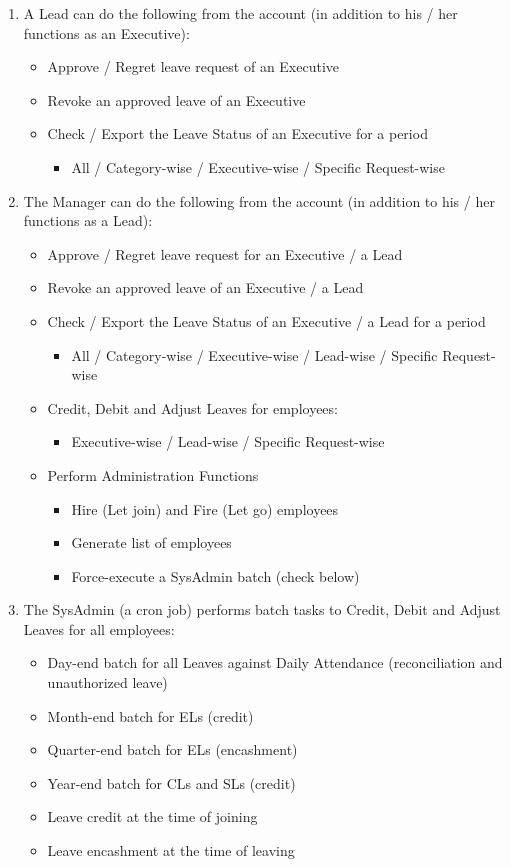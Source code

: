 \documentclass{article}
\begin{document}
\begin{footnotesize}
\begin{enumerate}
\begin{enumerate}
\item A Lead can do the following from the account (in addition to his / her functions as an Executive):
\begin{itemize}
\item Approve / Regret leave request of an Executive
\item Revoke an approved leave of an Executive
\item Check / Export the Leave Status of an Executive for a period
\begin{itemize}
\item All / Category-wise / Executive-wise / Specific Request-wise
\end{itemize}
\end{itemize}

\item The Manager can do the following from the account (in addition to his / her functions as a Lead):
\begin{itemize}
\item Approve / Regret leave request for an Executive / a Lead
\item Revoke an approved leave of an Executive / a Lead
\item Check / Export the Leave Status of an Executive / a Lead  for a period
\begin{itemize}
\item All / Category-wise / Executive-wise / Lead-wise / Specific Request-wise
\end{itemize}
\item Credit, Debit and Adjust Leaves for employees:
\begin{itemize}
\item Executive-wise / Lead-wise / Specific Request-wise
\end{itemize} 
\item Perform Administration Functions
\begin{itemize}
\item Hire (Let join) and Fire (Let go) employees
\item Generate list of employees
\item Force-execute a SysAdmin batch (check below)
\end{itemize}

\end{itemize}
\item The SysAdmin (a cron job) performs batch tasks to Credit, Debit and Adjust Leaves for all employees:
\begin{itemize}
\item Day-end batch for all Leaves against Daily Attendance (reconciliation and unauthorized leave)
\item Month-end batch for ELs (credit)
\item Quarter-end batch for ELs (encashment)
\item Year-end batch for CLs and SLs (credit)
\item Leave credit at the time of joining
\item Leave encashment at the time of leaving
\end{itemize} 


\end{enumerate}
\end{enumerate}
\end{footnotesize}
\end{document}
